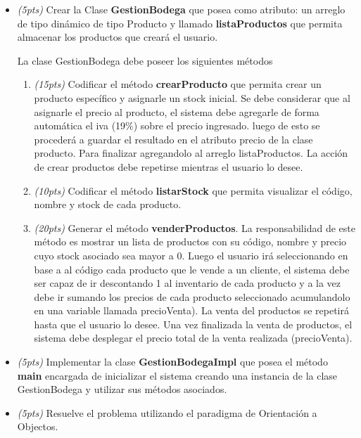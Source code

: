 \documentclass[10pt]{article}
\begin{document}
\begin{enumerate}
\begin{itemize}
\item \emph{(5pts)} Crear la Clase \textbf{GestionBodega} que posea como atributo:
 un arreglo de tipo dinámico de tipo Producto y llamado \textbf{listaProductos} que permita almacenar los productos que crear\'a el usuario.

La clase GestionBodega debe poseer los siguientes m\'etodos
\begin{enumerate}

  \item \emph{(15pts)} Codificar el m\'etodo \textbf{crearProducto} que permita crear un  producto específico y asignarle un stock inicial. Se debe considerar que al asignarle el precio al producto, el sistema debe agregarle  de forma automática el iva (19\%) sobre el precio ingresado. luego de esto se procederá a guardar el resultado en el atributo precio de la clase producto. Para finalizar agregandolo al arreglo listaProductos.
  La acci\'on de crear productos debe repetirse mientras el usuario lo desee.

  \item \emph{(10pts)} Codificar el m\'etodo \textbf{listarStock} que permita visualizar el c\'odigo, nombre y stock de cada producto.

  \item \emph{(20pts)} Generar el m\'etodo \textbf{venderProductos}. La responsabilidad de este método es mostrar un lista de productos con su c\'odigo, nombre y precio cuyo stock asociado sea mayor a 0.  Luego el usuario ir\'a seleccionando en base a al c\'odigo cada producto que le vende a un cliente, el sistema debe ser capaz de ir descontando 1 al inventario de cada producto  y a la vez debe ir sumando los precios de cada producto seleccionado acumulandolo en una variable llamada precioVenta). La venta del productos se repetir\'a hasta que el usuario lo desee. Una vez finalizada la venta de productos, el sistema debe desplegar el precio total de la venta realizada (precioVenta).

\end{enumerate}
\item \emph{(5pts)} Implementar la clase \textbf{GestionBodegaImpl} que posea el m\'etodo \textbf{main} encargada de inicializar el sistema  creando una instancia de la clase GestionBodega y utilizar sus métodos asociados.

\item \emph{(5pts)} Resuelve el problema utilizando el paradigma de Orientaci\'on a Objectos.

\end{itemize}

\end{enumerate}
\end{document}
